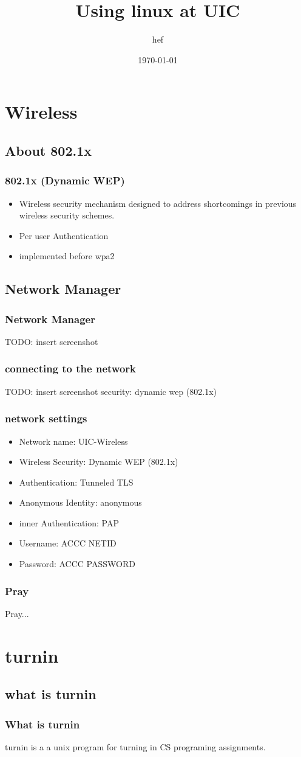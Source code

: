 \documentclass[hyperref={pdfpagelabels=false}]{beamer}
\title{Using linux at UIC}
\author{hef}
\date{\today}
\begin{document}
\frame{\titlepage}
\section[outline]{}
\frame[allowframebreaks]{\tableofcontents}
\section{Wireless}
\subsection{About 802.1x}
\frame
{
    \frametitle{802.1x (Dynamic WEP)}
    \begin{itemize}
    \item{Wireless security mechanism designed to address shortcomings in previous wireless security schemes.}
    \item{Per user Authentication}
    \item{implemented before wpa2}
    \end{itemize}
}
\subsection{Network Manager}
\frame
{
    \frametitle{Network Manager}
    TODO: insert screenshot
}
\frame
{
    \frametitle{connecting to the network}
    TODO: insert screenshot
    security: dynamic wep (802.1x)
}
\frame
{
    \frametitle{network settings}
    \begin{itemize}
    \item{Network name: UIC-Wireless}
    \item{Wireless Security: Dynamic WEP (802.1x)}
    \item{Authentication: Tunneled TLS}
    \item{Anonymous Identity: anonymous}
    \item{inner Authentication: PAP}
    \item{Username: ACCC NETID}
    \item{Password: ACCC PASSWORD}
    \end{itemize}
}
\frame
{
    \frametitle{Pray}
    Pray...
}
\section{turnin}
\subsection{what is turnin}
\frame
{
    \frametitle{What is turnin}
    turnin is a a unix program for turning in CS programing assignments.
}
\end{document}
